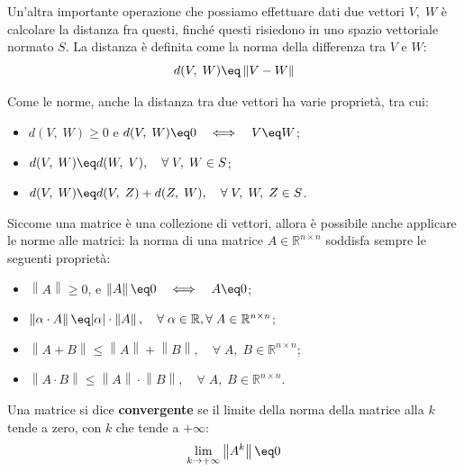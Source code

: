 Un'altra importante operazione che possiamo effettuare dati due vettori $V, \; W$ è calcolare la distanza fra questi, finché questi risiedono in uno spazio vettoriale normato $S$. La distanza è definita come la norma della differenza tra $V$ e $W$:
\[ d(V, \; W) \eq \left\| V - W \right\| \]

Come le norme, anche la distanza tra due vettori ha varie proprietà, tra cui:
\begin{itemize}
    \item $d(V, \; W) \geq 0$ e $d(V, \; W) \eq 0 \quad \Longleftrightarrow \quad V \eq W$;
    \item $d(V, \; W) \eq d(W, \; V), \quad \forall \; V, \; W \in S$;
    \item $d(V, \; W) \eq d(V, \; Z) + d(Z, \; W), \quad \forall \; V, \; W, \; Z \in S$.
\end{itemize}

Siccome una matrice è una collezione di vettori, allora è possibile anche applicare le norme alle matrici: la norma di una matrice $A \in \mathbb{R}^{n \times n}$ soddisfa sempre le seguenti proprietà:
\begin{itemize}
    \item $\left\| A \right\| \geq 0$, e $\left\| A \right\| \eq 0 \quad \Longleftrightarrow \quad A \eq 0$;
    \item $\left\| \alpha \cdot A \right\| \eq |\alpha| \cdot \left\| A \right\|, \quad \forall \; \alpha \in \mathbb{R}, \forall \; A \in \mathbb{R}^{n \times n}$;
    \item $\left\| A  + B \right\| \leq \left\| A \right\| + \left\| B \right\|, \quad \forall \; A, \; B \in \mathbb{R}^{n \times n}$;
    \item $\left\| A \cdot B \right\| \leq \left\| A \right\| \cdot \left\| B \right\|, \quad \forall \; A, \; B \in \mathbb{R}^{n \times n}$.
\end{itemize}

Una matrice si dice \textbf{convergente} se il limite della norma della matrice alla $k$ tende a zero, con $k$ che tende a $+\infty$:
\[ \lim_{k \to +\infty} \left\| A^k \right\| \eq 0 \]

